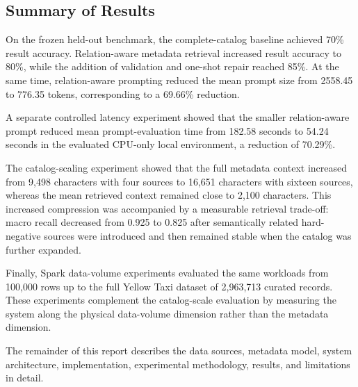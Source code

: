 \subsection{Summary of Results}

On the frozen held-out benchmark, the complete-catalog baseline achieved
70\% result accuracy. Relation-aware metadata retrieval increased result
accuracy to 80\%, while the addition of validation and one-shot repair reached
85\%. At the same time, relation-aware prompting reduced the mean prompt size
from 2558.45 to 776.35 tokens, corresponding to a 69.66\% reduction.

A separate controlled latency experiment showed that the smaller
relation-aware prompt reduced mean prompt-evaluation time from 182.58 seconds
to 54.24 seconds in the evaluated CPU-only local environment, a reduction of
70.29\%.

The catalog-scaling experiment showed that the full metadata context increased
from 9,498 characters with four sources to 16,651 characters with sixteen
sources, whereas the mean retrieved context remained close to 2,100
characters. This increased compression was accompanied by a measurable
retrieval trade-off: macro recall decreased from 0.925 to 0.825 after
semantically related hard-negative sources were introduced and then remained
stable when the catalog was further expanded.

Finally, Spark data-volume experiments evaluated the same workloads from
100,000 rows up to the full Yellow Taxi dataset of 2,963,713 curated records.
These experiments complement the catalog-scale evaluation by measuring the
system along the physical data-volume dimension rather than the metadata
dimension.

The remainder of this report describes the data sources, metadata model,
system architecture, implementation, experimental methodology, results, and
limitations in detail.
